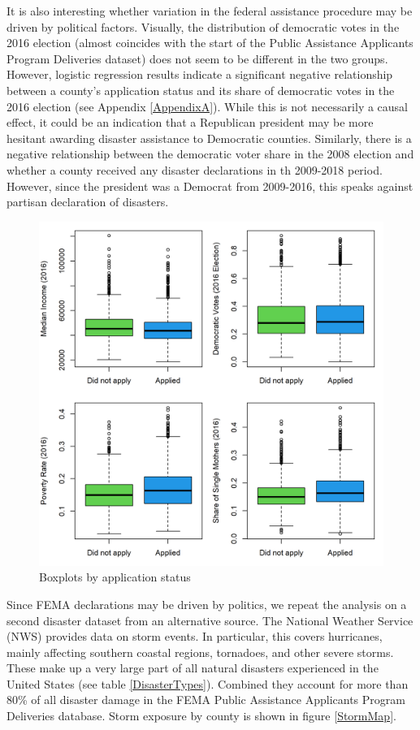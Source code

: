 It is also interesting whether variation in the federal assistance procedure may be driven by political factors. Visually, the distribution of democratic votes in the 2016 election (almost coincides with the start of the Public Assistance Applicants Program Deliveries dataset) does not seem to be different in the two groups. However, logistic regression results indicate a significant negative relationship between a county's application status and its share of democratic votes in the 2016 election (see Appendix \ref{AppendixA}). While this is not necessarily a causal effect, it could be an indication that a Republican president may be more hesitant awarding disaster assistance to Democratic counties. Similarly, there is a negative relationship between the democratic voter share in the 2008 election and whether a county received any disaster declarations in th 2009-2018 period. However, since the president was a Democrat from 2009-2016, this speaks against partisan declaration of disasters.

\begin{figure}[!h]
	\centering
	\includegraphics[scale=1]{"../Code & Data/AssistanceCovBoxplot.png"}
	\caption{Boxplots by application status}
	\label{AssistCovBoxplot}
\end{figure}

Since FEMA declarations may be driven by politics, we repeat the analysis on a second disaster dataset from an alternative source. The National Weather Service (NWS) provides data on storm events. In particular, this covers hurricanes, mainly affecting southern coastal regions, tornadoes, and other severe storms. These make up a very large part of all natural disasters experienced in the United States (see table \ref{DisasterTypes}). Combined they account for more than 80\% of all disaster damage in the FEMA Public Assistance Applicants Program Deliveries database. Storm exposure by county is shown in figure \ref{StormMap}.

